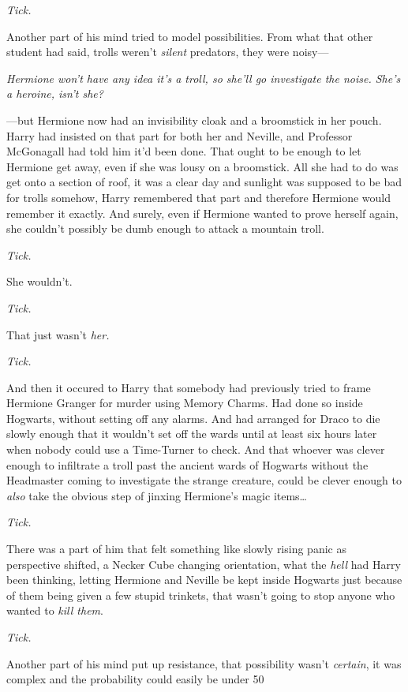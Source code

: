\emph{Tick.}

Another part of his mind tried to model possibilities. From what that other student had said, trolls weren't \emph{silent} predators, they were noisy---

\emph{Hermione won't have any idea it's a troll, so she'll go investigate the noise. She's a heroine, isn't she?}

---but Hermione now had an invisibility cloak and a broomstick in her pouch. Harry had insisted on that part for both her and Neville, and Professor McGonagall had told him it'd been done. That ought to be enough to let Hermione get away, even if she was lousy on a broomstick. All she had to do was get onto a section of roof, it was a clear day and sunlight was supposed to be bad for trolls somehow, Harry remembered that part and therefore Hermione would remember it exactly. And surely, even if Hermione wanted to prove herself again, she couldn't possibly be dumb enough to attack a mountain troll.

\emph{Tick.}

She wouldn't.

\emph{Tick.}

That just wasn't \emph{her.}

\emph{Tick.}

And then it occured to Harry that somebody had previously tried to frame Hermione Granger for murder using Memory Charms. Had done so inside Hogwarts, without setting off any alarms. And had arranged for Draco to die slowly enough that it wouldn't set off the wards until at least six hours later when nobody could use a Time-Turner to check. And that whoever was clever enough to infiltrate a troll past the ancient wards of Hogwarts without the Headmaster coming to investigate the strange creature, could be clever enough to \emph{also} take the obvious step of jinxing Hermione's magic items{\ldots}

\emph{Tick.}

There was a part of him that felt something like slowly rising panic as perspective shifted, a Necker Cube changing orientation, what the \emph{hell} had Harry been thinking, letting Hermione and Neville be kept inside Hogwarts just because of them being given a few stupid trinkets, that wasn't going to stop anyone who wanted to \emph{kill them}.

\emph{Tick.}

Another part of his mind put up resistance, that possibility wasn't \emph{certain}, it was complex and the probability could easily be under 50%

